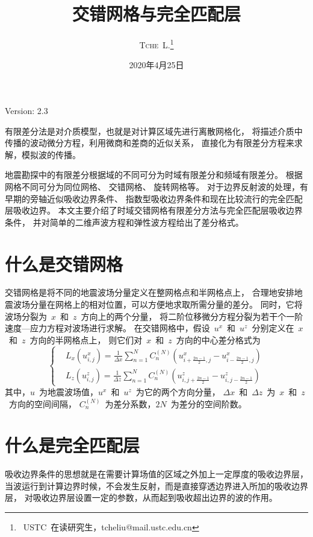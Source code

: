 \documentclass[UTF8]{ctexart}
\title{\vspace{10mm}\heiti\huge 交错网格与完全匹配层\vspace{30mm}}
\author{\LARGE\textsc{Tche~L.}\thanks{~USTC~在读研究生，tcheliu@mail.ustc.edu.cn}\vspace{10mm}}
\date{2020年4月25日}
\renewcommand{\cite}[1]{\textsuperscript{\textsuperscript{\citeleft\citen{#1}\citeright}}}          %
\begin{document}
\maketitle
\centerline{Version: 2.3}
\vspace{50mm}

有限差分法是对介质模型，也就是对计算区域先进行离散网格化，
将描述介质中传播的波动微分方程，利用微商和差商的近似关系，
直接化为有限差分方程来求解，模拟波的传播。

地震勘探中的有限差分根据域的不同可分为时域有限差分和频域有限差分。
根据网格不同可分为同位网格\cite{Alterman_1968}、
交错网格\cite{Virieux_1984}\cite{Virieux_1986}、
旋转网格\cite{Saenger_2000}\cite{Saenger_2004}等。
对于边界反射波的处理，有早期的旁轴近似吸收边界条件\cite{Clayton_1977}、
指数型吸收边界条件\cite{Cerjan_1985}和现在比较流行的完全匹配层吸收边界\cite{Collino_2001}。
本文主要介绍了时域交错网格有限差分方法与完全匹配层吸收边界条件，
并对简单的二维声波方程和弹性波方程给出了差分格式。

\newpage

\section{什么是交错网格}
交错网格是将不同的地震波场分量定义在整网格点和半网格点上，
合理地安排地震波场分量在网格上的相对位置，可以方便地求取所需分量的差分。
同时，它将波场分裂为~$x$~和~$z$~方向上的两个分量，
将二阶位移微分方程分裂为若干个一阶速度—应力方程对波场进行求解。
在交错网格中，假设~$u^x$~和~$u^z$~分别定义在~$x$~和~$z$~方向的半网格点上，
则它们对~$x$~和~$z$~方向的中心差分格式为\cite{sun_2013}
\begin{equation}
\left\{ \begin{aligned}
& L_x(u^x_{i,j})=\frac{1}{\Delta x}\sum_{n=1}^{N}C_n^{(N)}(u^x_{i+\frac{2n-1}{2},j}-u^x_{i-\frac{2n-1}{2},j}) \\
& L_z(u^z_{i,j})=\frac{1}{\Delta z}\sum_{n=1}^{N}C_n^{(N)}(u^z_{i,j+\frac{2n-1}{2}}-u^z_{i,j-\frac{2n-1}{2}})
\end{aligned} \right.
\end{equation}
其中，$u$~为地震波场值，$u^x$~和~$u^z$~为它的两个方向分量，
$\Delta x$~和~$\Delta z$~为~$x$~和~$z$~方向的空间间隔，
$C_n^{(N)}$~为差分系数，$2N$~为差分的空间阶数。

\section{什么是完全匹配层}
吸收边界条件的思想就是在需要计算场值的区域之外加上一定厚度的吸收边界层，
当波运行到计算边界时候，不会发生反射，而是直接穿透边界进入所加的吸收边界层，
对吸收边界层设置一定的参数，从而起到吸收超出边界的波的作用。
\end{document}
